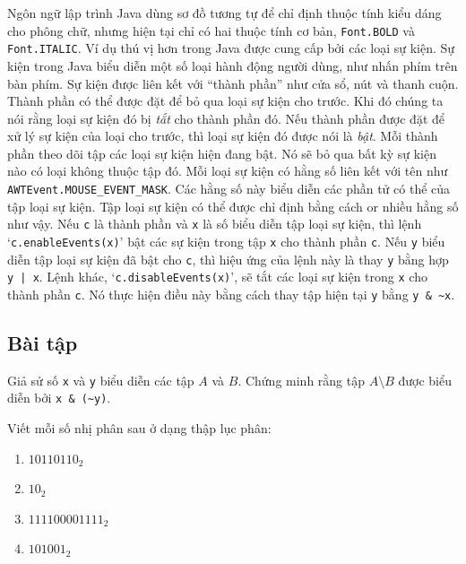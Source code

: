 Ngôn ngữ lập trình Java dùng sơ đồ tương tự để chỉ định thuộc tính kiểu dáng cho phông chữ, nhưng hiện tại chỉ có hai thuộc tính cơ bản, \texttt{Font.BOLD} và \texttt{Font.ITALIC}. Ví dụ thú vị hơn trong Java được cung cấp bởi các loại sự kiện. Sự kiện trong Java biểu diễn một số loại hành động người dùng, như nhấn phím trên bàn phím. Sự kiện được liên kết với ``thành phần'' như cửa sổ, nút và thanh cuộn. Thành phần có thể được đặt để bỏ qua loại sự kiện cho trước. Khi đó chúng ta nói rằng loại sự kiện đó bị \textit{tắt} cho thành phần đó. Nếu thành phần được đặt để xử lý sự kiện của loại cho trước, thì loại sự kiện đó được nói là \textit{bật}. Mỗi thành phần theo dõi tập các loại sự kiện hiện đang bật. Nó sẽ bỏ qua bất kỳ sự kiện nào có loại không thuộc tập đó. Mỗi loại sự kiện có hằng số liên kết với tên như \texttt{AWTEvent.MOUSE\_EVENT\_MASK}. Các hằng số này biểu diễn các phần tử có thể của tập loại sự kiện. Tập loại sự kiện có thể được chỉ định bằng cách or nhiều hằng số như vậy. Nếu \texttt{c} là thành phần và \texttt{x} là số biểu diễn tập loại sự kiện, thì lệnh `\texttt{c.enableEvents(x)}' bật các sự kiện trong tập \texttt{x} cho thành phần \texttt{c}. Nếu \texttt{y} biểu diễn tập loại sự kiện đã bật cho \texttt{c}, thì hiệu ứng của lệnh này là thay \texttt{y} bằng hợp \texttt{y | x}. Lệnh khác, `\texttt{c.disableEvents(x)}', sẽ tắt các loại sự kiện trong \texttt{x} cho thành phần \texttt{c}. Nó thực hiện điều này bằng cách thay tập hiện tại \texttt{y} bằng \texttt{y \& \~{}x}.

\subsection*{Bài tập}

\begin{exercise}
Giả sử số \texttt{x} và \texttt{y} biểu diễn các tập $A$ và $B$. Chứng minh rằng tập $A \setminus B$ được biểu diễn bởi \texttt{x \& (\~{}y)}.
\end{exercise}

\begin{exercise}
Viết mỗi số nhị phân sau ở dạng thập lục phân:
\begin{enumerate}[label=\alph*)]
\item $10110110_2$
\item $10_2$
\item $111100001111_2$
\item $101001_2$
\end{enumerate}
\end{exercise}

